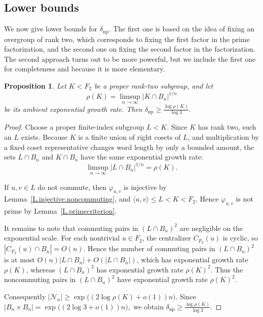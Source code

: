 \documentclass{amsproc}
\newtheorem{proposition}[theorem]{Proposition}
\begin{document}
\subsection{Lower bounds}

We now give lower bounds for $\delta_{\mathrm{np}}$. The first one is based on the idea of fixing an overgroup of rank two, which corresponds to fixing the first factor in the prime factorization, and the second one on fixing the second factor in the factorization. The second approach turns out to be more powerful, but we include the first one for completeness and because it is more elementary.

\begin{proposition}\label{P.fixedK.lower}
Let $K<F_2$ be a proper rank-two subgroup, and let
\[
        \rho(K)=\limsup_{n\to\infty}|K\cap B_n|^{1/n}
\]
be its ambient exponential growth rate.  Then
$
        \delta_{\mathrm{np}}
        \geq \frac{\log \rho(K)}{\log 3}.
$
\end{proposition}

\begin{proof}
Choose a proper finite-index subgroup $L<K$.  Since $K$ has rank two, such an
$L$ exists.  Because $K$ is a finite union of right cosets of $L$, and
multiplication by a fixed coset representative changes word length by only a
bounded amount, the sets $L\cap B_n$ and $K\cap B_n$ have the same exponential
growth rate:
\[
        \limsup_{n\to\infty}|L\cap B_n|^{1/n}=\rho(K).
\]

If $u,v\in L$ do not commute, then $\varphi_{u,v}$ is injective by
Lemma~\ref{L.injective.noncommuting}, and
$
        \langle u,v\rangle\leq L<K<F_2.
$
Hence $\varphi_{u,v}$ is not prime by Lemma~\ref{L.primecriterion}.

It remains to note that commuting pairs in $(L\cap B_n)^2$ are negligible on
the exponential scale.  For each nontrivial $u\in F_2$, the centralizer
$C_{F_2}(u)$ is cyclic, so
$
        |C_{F_2}(u)\cap B_n|=O(n).
$
Hence the number of commuting pairs in $(L\cap B_n)^2$ is at most
$O(n)|L\cap B_n|+O(|L\cap B_n|)$, which has exponential growth rate $\rho(K)$,
whereas $(L\cap B_n)^2$ has exponential growth rate $\rho(K)^2$.  Thus the
noncommuting pairs in $(L\cap B_n)^2$ have exponential growth rate $\rho(K)^2$.

Consequently
$
        |\mathcal N_n|\geq \exp\bigl((2\log \rho(K)+o(1))n\bigr).
$
Since
$
        |B_n\times B_n|=\exp\bigl((2\log 3+o(1))n\bigr),
$
we obtain
$
        \delta_{\mathrm{np}}\geq \frac{\log \rho(K)}{\log 3}.
$
\end{proof}
\end{document}
